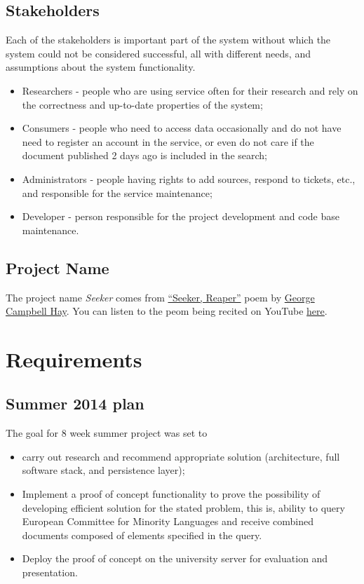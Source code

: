 \documentclass{tufte-book}
\begin{document}
\section{Stakeholders}

Each of the stakeholders is important part of the system without which the system could not be considered successful, all with different needs, and assumptions about the system functionality.

\begin{itemize}
  \item Researchers - people who are using service often for their research and rely on the correctness and up-to-date properties of the system;
  \item Consumers - people who need to access data occasionally and do not have need to register an account in the service, or even do not care if the document published 2 days ago is included in the search;
  \item Administrators - people having rights to add sources, respond to tickets, etc., and responsible for the service maintenance;
  \item Developer - person responsible for the project development and code base maintenance.
\end{itemize}

\section{Project Name}
The project name \emph{Seeker} comes from \href{http://www.scottishpoetrylibrary.org.uk/poetry/poems/seeker-reaper}{``Seeker, Reaper''} poem by \href{http://en.wikipedia.org/wiki/George_Campbell_Hay}{George Campbell Hay}. You can listen to the peom being recited on YouTube \href{https://www.youtube.com/watch?v=gjxPtRZFF24}{here}.



\chapter{Requirements}

\section{Summer 2014 plan}
The goal for 8 week summer project was set to
\begin{itemize}
  \item carry out research and recommend appropriate solution (architecture, full software stack, and persistence layer);
  \item Implement a proof of concept functionality to prove the possibility of developing efficient solution for the stated problem, this is, ability to query European Committee for Minority Languages and receive combined documents composed of elements specified in the query.
  \item Deploy the proof of concept on the university server for evaluation and presentation.
\end{itemize}
\end{document}
